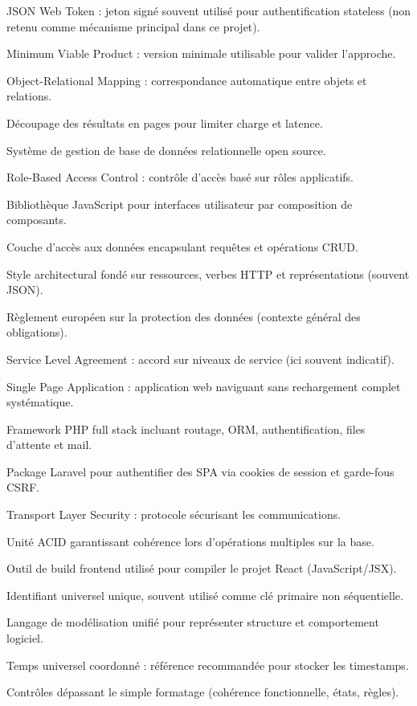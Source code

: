 \begin{description}[style=nextline,leftmargin=0.8cm]
  \item[JWT] JSON Web Token : jeton signé souvent utilisé pour authentification stateless (non retenu comme mécanisme principal dans ce projet).
  \item[MVP] Minimum Viable Product : version minimale utilisable pour valider l'approche.
  \item[ORM] Object-Relational Mapping : correspondance automatique entre objets et relations.
  \item[Pagination] Découpage des résultats en pages pour limiter charge et latence.
  \item[PostgreSQL] Système de gestion de base de données relationnelle open source.
  \item[RBAC] Role-Based Access Control : contrôle d'accès basé sur rôles applicatifs.
  \item[React] Bibliothèque JavaScript pour interfaces utilisateur par composition de composants.
  \item[Repository] Couche d'accès aux données encapsulant requêtes et opérations CRUD.
  \item[REST] Style architectural fondé sur ressources, verbes HTTP et représentations (souvent JSON).
  \item[RGPD] Règlement européen sur la protection des données (contexte général des obligations).
  \item[SLA] Service Level Agreement : accord sur niveaux de service (ici souvent indicatif).
  \item[SPA] Single Page Application : application web naviguant sans rechargement complet systématique.
  \item[Laravel] Framework PHP full stack incluant routage, ORM, authentification, files d'attente et mail.
  \item[Sanctum] Package Laravel pour authentifier des SPA via cookies de session et garde-fous CSRF.
  \item[TLS] Transport Layer Security : protocole sécurisant les communications.
  \item[Transaction] Unité ACID garantissant cohérence lors d'opérations multiples sur la base.
  \item[Vite] Outil de build frontend utilisé pour compiler le projet React (JavaScript/JSX).
  \item[UUID] Identifiant universel unique, souvent utilisé comme clé primaire non séquentielle.
  \item[UML] Langage de modélisation unifié pour représenter structure et comportement logiciel.
  \item[UTC] Temps universel coordonné : référence recommandée pour stocker les timestamps.
  \item[Validation métier] Contrôles dépassant le simple formatage (cohérence fonctionnelle, états, règles).
\end{description}

